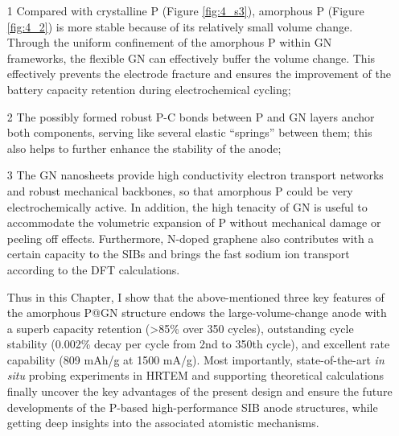 \begin{itemize}
	\item[1] Compared with crystalline P (Figure \ref{fig:4_s3}), amorphous P (Figure \ref{fig:4_2}) is more stable because of its relatively small volume change.\cite{Qian2013b,Kim2013c} Through the uniform confinement of the amorphous P within GN frameworks, the flexible GN can effectively buffer the volume change. This effectively prevents the electrode fracture and ensures the improvement of the battery capacity retention during electrochemical cycling;\\
    \item[2] The possibly formed robust P-C bonds between P and GN layers anchor both components, serving like several elastic “springs” between them; this also helps to further enhance the stability of the anode;\\
    \item[3] The GN nanosheets provide high conductivity electron transport networks and robust mechanical backbones, so that amorphous P could be very electrochemically active. In addition, the high tenacity of GN is useful to accommodate the volumetric expansion of P without mechanical damage or peeling off effects. Furthermore, N-doped graphene also contributes with a certain capacity to the SIBs and brings the fast sodium ion transport according to the DFT calculations.

Thus in this Chapter, I show that the above-mentioned three key features of the amorphous P@GN structure endows the large-volume-change anode with a superb capacity retention (>85\% over 350 cycles), outstanding cycle stability (0.002\% decay per cycle from 2nd to 350th cycle), and excellent rate capability (809 mAh/g at 1500 mA/g). Most importantly, state-of-the-art {\em in situ} probing experiments in HRTEM and supporting theoretical calculations finally uncover the key advantages of the present design and ensure the future developments of the P-based high-performance SIB anode structures, while getting deep insights into the associated atomistic mechanisms. 
\end{itemize}

